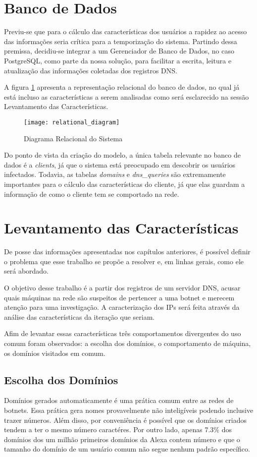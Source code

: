 \section{Banco de Dados}
Previu-se que para o cálculo das características dos usuários a rapidez ao acesso das informações seria crítica para a temporização do sistema. Partindo dessa premissa, decidiu-se integrar a um Gerenciador de Banco de Dados, no caso PostgreSQL, como parte da nossa solução, para facilitar a escrita, leitura e atualização das informações coletadas dos registros DNS.

A figura \ref{fig:relational_diagram} apresenta a representação relacional do banco de dados, no qual já está incluso as características a serem analisadas como será esclarecido na sessão Levantamento das Características.

\begin{figure}
\texttt{[image: relational\_diagram]}
\caption[Diagrama Relacional do Sistema]{Diagrama Relacional do Sistema} \label{fig:relational_diagram}
\end{figure}

Do ponto de vista da criação do modelo, a única tabela relevante no banco de dados é a \textit{clients}, já que o sistema está preocupado em descobrir os usuários infectados. Todavia, as tabelas \textit{domains} e \textit{dns\_queries} são extremamente importantes para o cálculo das características do cliente, já que elas guardam a informação de como o cliente tem se comportado na rede.

\section{Levantamento das Características}
De posse das informações apresentadas nos capítulos anteriores, é possível definir o problema que esse trabalho se propõe a resolver e, em linhas gerais, como ele será abordado.

O objetivo desse trabalho é a partir dos registros de um servidor DNS, acusar quais máquinas na rede são suspeitos de pertencer a uma botnet e merecem atenção para uma investigação. A caracterização dos IPs será feita através da análise das características da iteração que seriam.

Afim de levantar essas características três comportamentos divergentes do uso comum foram observados: a escolha dos domínios, o comportamento de máquina, os domínios visitados em comum.

\subsection{Escolha dos Domínios}
Domínios gerados automaticamente é uma prática comum entre as redes de botnets. Essa prática gera nomes provavelmente não inteligíveis podendo inclusive trazer números. Além disso, por conveniência é possível que os domínios criados tendem a ter o mesmo número caractéres. Por outro lado, apenas 7.3\% dos domínios dos um milhão primeiros domínios da Alexa contem número e que o tamanho do domínio de um usuário comum não segue nenhum padrão específico.

